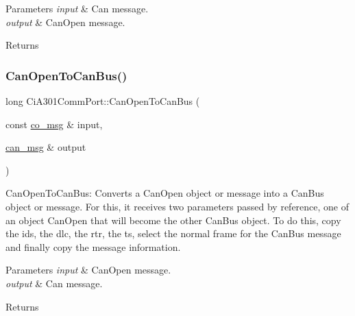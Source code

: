 \begin{DoxyParams}{Parameters}
{\em input} & Can message. \\
\hline
{\em output} & Can\+Open message. \\
\hline
\end{DoxyParams}
\begin{DoxyReturn}{Returns}

\end{DoxyReturn}
\mbox{\label{classCiA301CommPort_a26346f83700bc8403a315be01c6508e0}} 
\subsubsection{\texorpdfstring{Can\+Open\+To\+Can\+Bus()}{CanOpenToCanBus()}}
{\footnotesize\ttfamily long Ci\+A301\+Comm\+Port\+::\+Can\+Open\+To\+Can\+Bus (\begin{DoxyParamCaption}\item[{const \hyperlink{structco__msg}{co\+\_\+msg} \&}]{input,  }\item[{\hyperlink{structcan__msg}{can\+\_\+msg} \&}]{output }\end{DoxyParamCaption})\hspace{0.3cm}{\ttfamily [private]}}



Can\+Open\+To\+Can\+Bus\+: Converts a Can\+Open object or message into a Can\+Bus object or message. For this, it receives two parameters passed by reference, one of an object Can\+Open that will become the other Can\+Bus object. To do this, copy the ids, the dlc, the rtr, the ts, select the normal frame for the Can\+Bus message and finally copy the message information. 


\begin{DoxyParams}{Parameters}
{\em input} & Can\+Open message. \\
\hline
{\em output} & Can message. \\
\hline
\end{DoxyParams}
\begin{DoxyReturn}{Returns}

\end{DoxyReturn}
\mbox{\label{classCiA301CommPort_a2e85303159577f6b3209b741e9871cc5}} 
